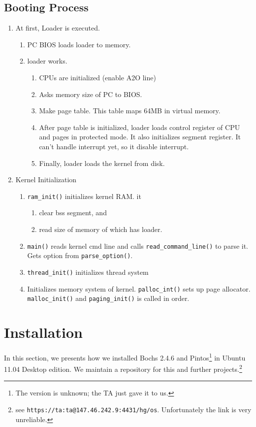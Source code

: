 \documentclass[a4paper,article,11pt,oneside]{article}
\begin{document}
\subsection{Booting Process}\label{subsecbooting}
\begin{enumerate}
\item At first, Loader is executed.
\begin{enumerate}
\item PC BIOS loads loader to memory.
\item loader works.
\begin{enumerate}
\item CPUs are initialized (enable A2O line)
\item Asks memory size of PC to BIOS.
\item Make page table. This table maps 64MB in virtual memory.
\item After page table is initialized, loader loads control register
  of CPU and pages in protected mode. It also initializes segment
  register. It can't handle interrupt yet, so it disable interrupt.
\item Finally, loader loads the kernel from disk.
\end{enumerate}
\end{enumerate}
\item Kernel Initialization
\begin{enumerate}
\item \texttt{ram\_init()} initializes kernel RAM. it
\begin{enumerate}
\item clear bss segment, and
\item read size of memory of which has loader.
\end{enumerate}
\item \texttt{main()} reads kernel cmd line and calls \texttt{read\_command\_line()} to parse it. Gets option from \texttt{parse\_option()}.
\item \texttt{thread\_init()} initializes thread system
\item Initializes memory system of kernel. \texttt{palloc\_int()} sets up page allocator. \texttt{malloc\_init()} and \texttt{paging\_init()} is called in order.
\end{enumerate}
\end{enumerate}

\section{Installation}\label{secinstall}
In this section, we presents how we installed Bochs 2.4.6 and
Pintos\footnote{The version is unknown; the TA just gave it to us.} in
Ubuntu 11.04 Desktop edition. We maintain a repository for this and
further projects.\footnote{see
  \texttt{https://ta:ta@147.46.242.9:4431/hg/os}. Unfortunately the
  link is very unreliable.}
\end{document}
